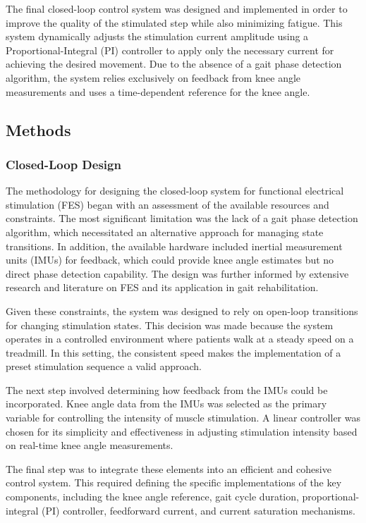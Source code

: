 
The final closed-loop control system was designed and implemented in order to improve the quality of the stimulated step while also minimizing fatigue.  This system dynamically adjusts the stimulation current amplitude using a Proportional-Integral (PI) controller to apply only the necessary current for achieving the desired movement. Due to the absence of a gait phase detection algorithm, the system relies exclusively on feedback from knee angle measurements and uses a time-dependent reference for the knee angle. 

\subsection{Methods}
\subsubsection{Closed-Loop Design}
The methodology for designing the closed-loop system for functional electrical stimulation (FES) began with an assessment of the available resources and constraints. The most significant limitation was the lack of a gait phase detection algorithm, which necessitated an alternative approach for managing state transitions. In addition, the available hardware included inertial measurement units (IMUs) for feedback, which could provide knee angle estimates but no direct phase detection capability. The design was further informed by extensive research and literature on FES and its application in gait rehabilitation.

Given these constraints, the system was designed to rely on open-loop transitions for changing stimulation states. This decision was made because the system operates in a controlled environment where patients walk at a steady speed on a treadmill. In this setting, the consistent speed makes the implementation of a preset stimulation sequence a valid approach.

The next step involved determining how feedback from the IMUs could be incorporated. Knee angle data from the IMUs was selected as the primary variable for controlling the intensity of muscle stimulation. A linear controller was chosen for its simplicity and effectiveness in adjusting stimulation intensity based on real-time knee angle measurements.

The final step was to integrate these elements into an efficient and cohesive control system. This required defining the specific implementations of the key components, including the knee angle reference, gait cycle duration, proportional-integral (PI) controller, feedforward current, and current saturation mechanisms.

